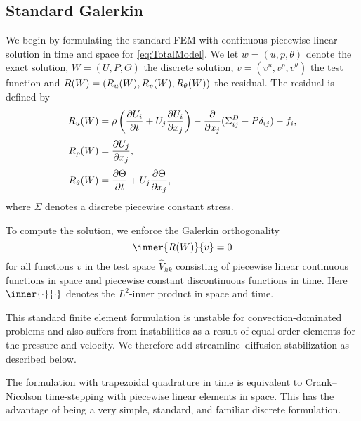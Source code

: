 \subsection{Standard Galerkin}

We begin by formulating the standard \cgone{}\cgone{} FEM
\citep{ErikssonEstepHansboEtAl1996} with continuous piecewise linear
solution in time and space for \eqref{eq:TotalModel}. We let $w = (u,
  p, \theta)$ denote the exact solution, \hbox{$W=(U,P,\Theta)$} the
discrete solution, $v = (v^u, v^p, v^\theta)$ the test function and
$R(W) = (R_u(W), R_p(W),\break R_\theta(W))$ the residual. The residual is defined by\vspace*{1.5pt}
\begin{equation} \label{eq:TotalModel}
  \begin{split}
    R_u(W) &= \rho\left(\frac{\partial U_i}{\partial t} + U_j \frac{\partial U_i}{\partial x_j} \right) - \frac{\partial}{\partial x_j} (\Sigma^D_{ij} - P \delta_{ij}) - f_i,\\[3pt]
    R_p(W) &= \frac{\partial U_j}{\partial x_j},\\[3pt]
    R_\theta(W) &= \frac{\partial\Theta}{\partial t} + U_j \frac{\partial \Theta}{\partial x_j},
  \end{split}\vspace*{1.5pt}
\end{equation}
where $\Sigma$ denotes a discrete piecewise constant stress.

To compute the solution, we enforce the Galerkin orthogonality\vspace*{1.5pt}
\begin{equation}
  \inner{R(W)}{v} = 0\vspace*{1.5pt}
\end{equation}
for all functions $v$ in the test space $\hat{V}_{hk}$ consisting of
piecewise linear continuous functions in space and piecewise constant
discontinuous functions in time. Here $\inner{\cdot}{\cdot}$ denotes
the $L^2$-inner product in space and time.

This standard finite element formulation is unstable for
convection-dominated problems and also suffers from instabilities as a
result of equal order elements for the pressure and velocity. We
therefore add streamline--diffusion stabilization as described below.

The \cgone{}\cgone{} formulation with trapezoidal quadrature in time
is equivalent to Crank--Nicolson time-stepping with piecewise linear
elements in space. This has the advantage of being a very simple,
standard, and familiar discrete formulation.


